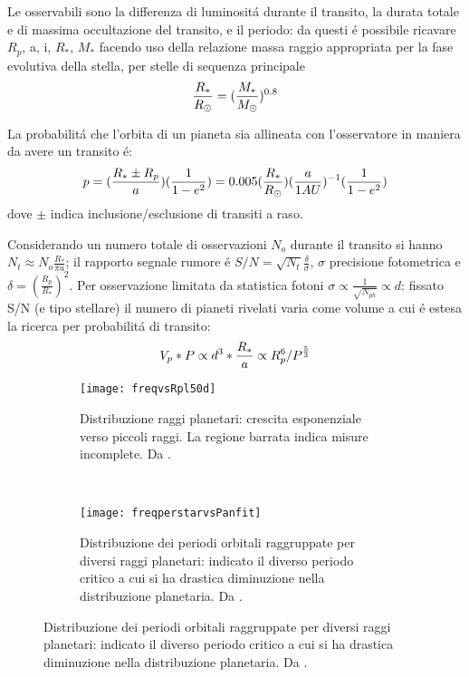 Le osservabili sono la differenza di luminosit\'a durante il transito, la durata totale e di massima occultazione del transito, e il periodo: da questi \'e possibile ricavare $R_p$, a, i, $R_*$, $M_*$ facendo uso della relazione massa raggio appropriata per la fase evolutiva della stella, per stelle di sequenza principale
\begin{equation}
\frac{R_*}{R_{\odot}{}}=(\frac{M_*}{M_{\odot}{}})^{0.8}
\end{equation}

La probabilit\'a che l'orbita di un pianeta sia allineata con l'osservatore in maniera da avere un transito \'e:
\begin{equation}
p=(\frac{R_*\pm R_p}{a})(\frac{1}{1-e^2})=0.005(\frac{R_*}{R_{\odot}{}})(\frac{a}{1AU})^{-1}(\frac{1}{1-e^2})
\end{equation}
dove $\pm$ indica inclusione/esclusione di transiti a raso.

Considerando un numero totale di osservazioni $N_o$ durante il transito si hanno $N_t\approx N_o\frac{R_*}{\pi a}$; il rapporto segnale rumore \'e $S/N=\sqrt{N_t}\frac{\delta}{\sigma}$, $\sigma$ precisione fotometrica e $\delta=(\frac{R_p}{R_*})^2$. Per osservazione limitata da statistica fotoni $\sigma\propto\frac{1}{\sqrt{N_{ph}}}\propto d$: fissato S/N (e tipo stellare) il numero di pianeti rivelati varia come volume a cui \'e estesa la ricerca per probabilit\'a di transito:
\begin{equation}
V_p*P\propto d^3*\frac{R_*}{a}\propto R_p^6/P^{\frac{5}{3}}
\end{equation}

\begin{figure}[!ht]
	\begin{subfigure}[b]{0.5\textwidth}
		\centering
		\texttt{[image: freqvsRpl50d]}
		\caption{Distribuzione raggi planetari: crescita esponenziale verso piccoli raggi. La regione barrata indica misure incomplete. Da \cite{howard2012planet}.}\label{fig:howard2012planet}
	\end{subfigure}
	~
	\begin{subfigure}[b]{0.5\textwidth} \centering
		\texttt{[image: freqperstarvsPanfit]}
		\caption{Distribuzione dei periodi orbitali raggruppate per diversi raggi planetari: indicato il diverso periodo critico a cui si ha drastica diminuzione nella distribuzione planetaria. Da \cite{howard2012planet}.}\label{fig:freqperstarvsPanfit}
	\end{subfigure}
\end{figure}

